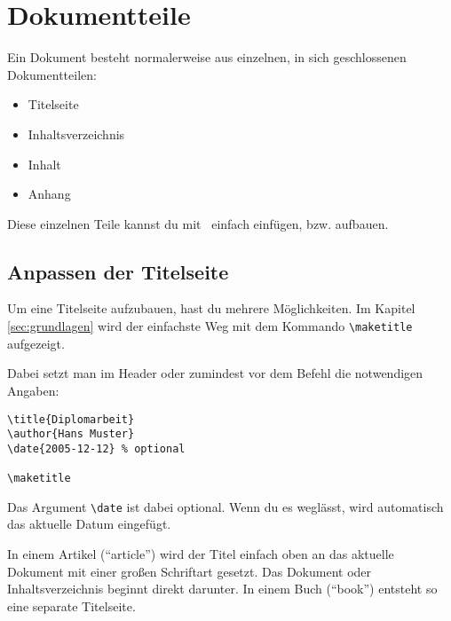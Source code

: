 %
%

\chapter{Dokumentteile}

Ein Dokument besteht normalerweise aus einzelnen, in sich geschlossenen Dokumentteilen:

\begin{itemize}
	\item Titelseite
	\item Inhaltsverzeichnis
	\item Inhalt
	\item Anhang
\end{itemize}

Diese einzelnen Teile kannst du mit \DMLLaTeX \ einfach einfügen, bzw. aufbauen.

\section{Anpassen der Titelseite}

Um eine Titelseite aufzubauen, hast du mehrere Möglichkeiten. Im Kapitel \ref{sec:grundlagen} wird der einfachste Weg mit dem Kommando \texttt{\textbackslash maketitle} aufgezeigt.

Dabei setzt man im Header oder zumindest vor dem Befehl die notwendigen Angaben:

\begin{lstlisting}
\title{Diplomarbeit}
\author{Hans Muster}
\date{2005-12-12} % optional

\maketitle
\end{lstlisting}

Das Argument \texttt{\textbackslash date} ist dabei optional. Wenn du es weglässt, wird automatisch das aktuelle Datum eingefügt. 

In einem Artikel (\enquote{article}) wird der Titel einfach oben an das aktuelle Dokument mit einer großen Schriftart gesetzt. Das Dokument oder Inhaltsverzeichnis beginnt direkt darunter. In einem Buch (\enquote{book}) entsteht so eine separate Titelseite.

